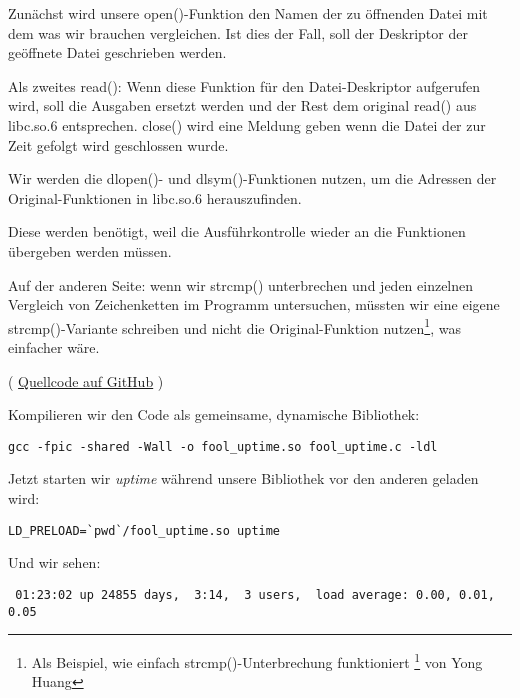 Zunächst wird unsere open()-Funktion den Namen der zu öffnenden Datei mit dem was
wir brauchen vergleichen. Ist dies der Fall, soll der Deskriptor der geöffnete Datei
geschrieben werden.

Als zweites read(): Wenn diese Funktion für den Datei-Deskriptor aufgerufen wird,
soll die Ausgaben ersetzt werden und der Rest dem original read() aus libc.so.6
entsprechen.
close() wird eine Meldung geben wenn die Datei der zur Zeit gefolgt wird geschlossen
wurde.


Wir werden die dlopen()- und dlsym()-Funktionen nutzen, um die Adressen der Original-Funktionen
in libc.so.6 herauszufinden.

Diese werden benötigt, weil die Ausführkontrolle wieder an die  Funktionen
übergeben werden müssen.


Auf der anderen Seite: wenn wir strcmp() unterbrechen und jeden einzelnen Vergleich
von Zeichenketten im Programm untersuchen, müssten wir eine eigene strcmp()-Variante
schreiben und nicht die Original-Funktion
nutzen\footnote{Als Beispiel, wie einfach strcmp()-Unterbrechung funktioniert
\footnote{\href{http://go.yurichev.com/17143}{yurichev.com}} von Yong Huang}, was
einfacher wäre.


( \href{https://github.com/DennisYurichev/RE-for-beginners/blob/master/OS/LD_PRELOAD/fool_uptime.c}{Quellcode auf GitHub} )

Kompilieren wir den Code als gemeinsame, dynamische Bibliothek:

\begin{lstlisting}
gcc -fpic -shared -Wall -o fool_uptime.so fool_uptime.c -ldl
\end{lstlisting}

Jetzt starten wir \emph{uptime} während unsere Bibliothek vor den anderen geladen wird:

\begin{lstlisting}
LD_PRELOAD=`pwd`/fool_uptime.so uptime
\end{lstlisting}

Und wir sehen:

\begin{lstlisting}
 01:23:02 up 24855 days,  3:14,  3 users,  load average: 0.00, 0.01, 0.05
\end{lstlisting}

